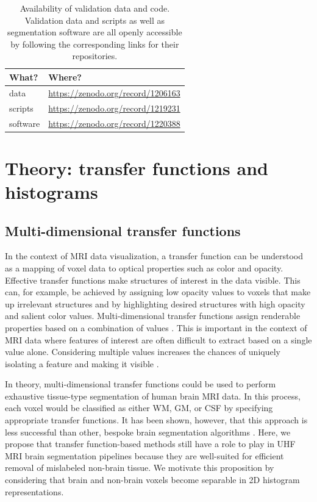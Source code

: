 \begin{table}[htb!]
\centering
\caption{Availability of validation data and code. Validation data and scripts as well as segmentation software are all openly accessible by following the corresponding links for their repositories.}
\begin{tabular}{ll}
\\
\hline
What? & Where? \\
\midrule
data & \url{https://zenodo.org/record/1206163}\\
scripts & \url{https://zenodo.org/record/1219231}\\
software & \url{https://zenodo.org/record/1220388}\\
\bottomrule
\end{tabular}
\label{tab:availability}
\end{table}

\section{Theory: transfer functions and histograms}
\label{sec:Theory}

\subsection{Multi-dimensional transfer functions}
In the context of MRI data visualization, a transfer function can be understood as a mapping of voxel data to optical properties such as color and opacity. Effective transfer functions make structures of interest in the data visible. This can, for example, be achieved by assigning low opacity values to voxels that make up irrelevant structures and by highlighting desired structures with high opacity and salient color values. Multi-dimensional transfer functions assign renderable properties based on a combination of values \parencite{Kniss2002, Kindlmann1998, Kniss2005, Kniss2001}. This is important in the context of MRI data where features of interest are often difficult to extract based on a single value alone. Considering multiple values increases the chances of uniquely isolating a feature and making it visible \parencite{Kniss2002}.

In theory, multi-dimensional transfer functions could be used to perform exhaustive tissue-type segmentation of human brain MRI data. In this process, each voxel would be classified as either WM, GM, or CSF by specifying appropriate transfer functions. It has been shown, however, that this approach is less successful than other, bespoke brain segmentation algorithms \parencite{Ljung2016}. Here, we propose that transfer function-based methods still have a role to play in UHF MRI brain segmentation pipelines because they are well-suited for efficient removal of mislabeled non-brain tissue. We motivate this proposition by considering that brain and non-brain voxels become separable in 2D histogram representations.

